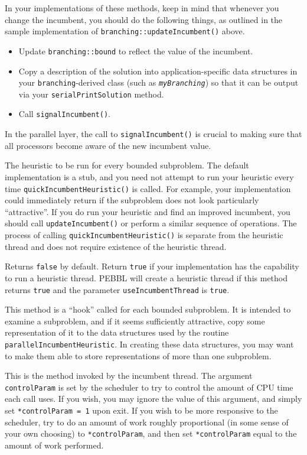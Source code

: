 In your implementations of these methods, keep in mind that whenever
you change the incumbent, you should do the following things, as
outlined in the sample implementation of
\texttt{branching::updateIncumbent()} above.
\begin{itemize}
\item Update \texttt{branching::bound} to reflect the value of the
  incumbent.
\item Copy a description of the solution into application-specific
  data structures in your \texttt{branching}-derived class (such as
  \texttt{\emph{myBranching}}) so that it can be output via your
  \texttt{serialPrintSolution} method.
\item Call \texttt{signalIncumbent()}.
\end{itemize}
In the parallel layer, the call to \texttt{signalIncumbent()} is
crucial to making sure that all processors become aware of the new
incumbent value.

The heuristic to be run for every bounded subproblem.  The default
implementation is a stub, and you need not attempt to run your
heuristic every time \texttt{quickIncumbentHeuristic()} is called.
For example, your implementation could immediately return if the
subproblem does not look particularly ``attractive''.  If you do run your
heuristic and find an improved incumbent, you should call
\texttt{updateIncumbent()} or perform a similar sequence of
operations.  The process of calling \texttt{quickIncumbentHeuristic()}
is separate from the heuristic thread and does not require existence
of the heuristic thread.

Returns \texttt{false} by default.  Return \texttt{true} if your
implementation has the capability to run a heuristic thread.  PEBBL
will create a heuristic thread if this method returns \texttt{true} and
the parameter \texttt{useIncumbentThread} is \texttt{true}.

This method is a ``hook'' called for each bounded subproblem.  It is
intended to examine a subproblem, and if it seems
sufficiently attractive, copy some representation of it to the data
structures used by the routine \texttt{parallelIncumbentHeuristic}.
In creating these data structures, you may want to make them able to
store representations of more than one subproblem.

This is the method invoked by the incumbent thread.  The argument
\texttt{controlParam} is set by the scheduler to try to control the
amount of CPU time each call uses.  If you wish, you may ignore the
value of this argument, and simply set \texttt{*controlParam = 1} upon
exit. If you wish to be more responsive to the scheduler, try to do an
amount of work roughly proportional (in some sense of your own
choosing) to \texttt{*controlParam}, and then set
\texttt{*controlParam} equal to the amount of work performed.  

